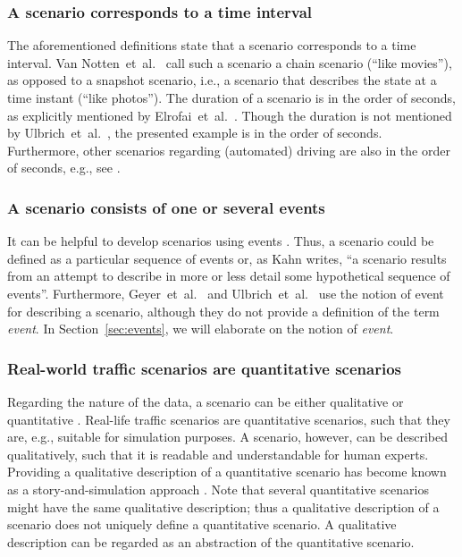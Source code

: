 \subsubsection{A scenario corresponds to a time interval}
The aforementioned definitions \cite{go2004blind, geyer2014, ulbrich2015, elrofai2016scenario} state that a scenario corresponds to a time interval. Van Notten~et~al.~\cite{vannotten2003updated} call such a scenario a chain scenario (``like movies''), as opposed to a snapshot scenario, i.e., a scenario that describes the state at a time instant (``like photos''). The duration of a scenario is in the order of seconds, as explicitly mentioned by Elrofai~et~al.~\cite{elrofai2016scenario}. Though the duration is not mentioned by Ulbrich~et~al.~\cite{ulbrich2015}, the presented example is in the order of seconds. Furthermore, other scenarios regarding (automated) driving are also in the order of seconds, e.g., see \cite{gietelink2006development, zofka2015datadrivetrafficscenarios, roesener2017comprehensive, karaduman2013interactivebehavior, hulshof2013autonomous, englund2016grand}.

\subsubsection{A scenario consists of one or several events \cite{vannotten2003updated, go2004blind, geyer2014, ulbrich2015, kahn1962, englund2016grand, schoemaker1993multiple, cuppens2002alert, bach2016modelbased}}
It can be helpful to develop scenarios using events \cite{bishop2007scentechniques}. Thus, a scenario could be defined as a particular sequence of events or, as Kahn \cite{kahn1962} writes, ``a scenario results from an attempt to describe in more or less detail some hypothetical sequence of events''. Furthermore, Geyer~et~al.~\cite{geyer2014} and Ulbrich~et~al.~\cite{ulbrich2015} use the notion of event for describing a scenario, although they do not provide a definition of the term \emph{event}. In Section~\ref{sec:events}, we will elaborate on the notion of \emph{event}.

\subsubsection{Real-world traffic scenarios are quantitative scenarios}
Regarding the nature of the data, a scenario can be either qualitative or quantitative \cite{vannotten2003updated}. Real-life traffic scenarios are quantitative scenarios, such that they are, e.g., suitable for simulation purposes. A scenario, however, can be described qualitatively, such that it is readable and understandable for human experts. Providing a qualitative description of a quantitative scenario has become known as a story-and-simulation approach \cite{alcamo2001scenarios}. Note that several quantitative scenarios might have the same qualitative description; thus a qualitative description of a scenario does not uniquely define a quantitative scenario. A qualitative description can be regarded as an abstraction of the quantitative scenario.
	
